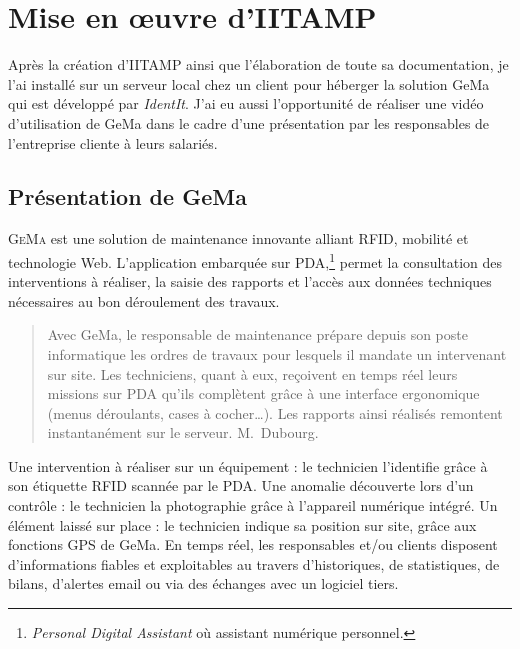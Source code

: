 \chapter{Mise en \oe{}uvre d'IITAMP} %
\label{cha:Mise en oeuvre d'IITAMP}

\begin{it}
Après la création d'IITAMP ainsi que l'élaboration de toute sa
documentation, je l'ai installé sur un serveur local chez un client pour
héberger la solution GeMa qui est développé par \emph{IdentIt}. J'ai eu
aussi l'opportunité de réaliser une vidéo d'utilisation de GeMa dans le
cadre d'une présentation par les responsables de l'entreprise cliente à
leurs salariés.
\end{it}

\section{Présentation de GeMa} %
\label{sec:Présentation de GeMa}

\lettrine{G}{eMa} est une solution de maintenance innovante alliant
RFID, mobilité et technologie Web. L'application embarquée sur
PDA,\footnote{\emph{Personal Digital Assistant} où assistant numérique
personnel.} permet la consultation des interventions à réaliser, la
saisie des rapports et l'accès aux données techniques nécessaires au bon
déroulement des travaux.

\begin{quotation}
\og{}Avec GeMa, le responsable de maintenance prépare depuis son poste
informatique les ordres de travaux pour lesquels il mandate un
intervenant sur site. Les techniciens, quant à eux, reçoivent en temps
réel leurs missions sur PDA qu'ils complètent grâce à une interface
ergonomique (menus déroulants, cases à cocher\dots). Les rapports ainsi
réalisés remontent instantanément sur le serveur. \fg{} M.~Dubourg.
\end{quotation}

Une intervention à réaliser sur un équipement : le technicien
l'identifie grâce à son étiquette RFID scannée par le PDA. Une anomalie
découverte lors d'un contrôle : le technicien la photographie grâce à
l'appareil numérique intégré. Un élément laissé sur place : le
technicien indique sa position sur site, grâce aux fonctions GPS de
GeMa. En temps réel, les responsables et/ou clients disposent
d'informations fiables et exploitables au travers d'historiques, de
statistiques, de bilans, d'alertes email ou via des échanges avec un
logiciel tiers.

